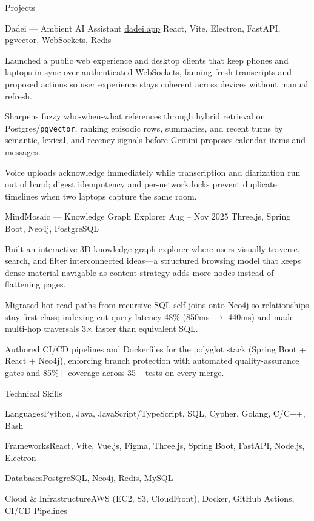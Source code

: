 \documentclass[
	11pt
]{../../../resume}
\begin{document}
	\begin{rSection}{P}{rojects}
		\begin{rSectionEntry}
			{Dadei --- Ambient AI Assistant}
			{\href{https://dadei.app}{dadei.app}}
			{}
			{React, Vite, Electron, FastAPI, pgvector, WebSockets, Redis}
			{}

			\item Launched a public web experience and desktop clients that keep phones and laptops in sync over authenticated WebSockets, fanning fresh transcripts and proposed actions so user experience stays coherent across devices without manual refresh.
			\item Sharpens fuzzy who-when-what references through hybrid retrieval on Postgres/\texttt{pgvector}, ranking episodic rows, summaries, and recent turns by semantic, lexical, and recency signals before Gemini proposes calendar items and messages.
			\item Voice uploads acknowledge immediately while transcription and diarization run out of band; digest idempotency and per-network locks prevent duplicate timelines when two laptops capture the same room.
		\end{rSectionEntry}

		\begin{rSectionEntry}
			{MindMosaic --- Knowledge Graph Explorer}
			{Aug -- Nov 2025}
			{}
			{Three.js, Spring Boot, Neo4j, PostgreSQL}
			{}

			\item Built an interactive 3D knowledge graph explorer where users visually traverse, search, and filter interconnected ideas---a structured browsing model that keeps dense material navigable as content strategy adds more nodes instead of flattening pages.
			\item Migrated hot read paths from recursive SQL self-joins onto Neo4j so relationships stay first-class; indexing cut query latency 48\% (850ms $\rightarrow$ 440ms) and made multi-hop traversals 3$\times$ faster than equivalent SQL.
			\item Authored CI/CD pipelines and Dockerfiles for the polyglot stack (Spring Boot + React + Neo4j), enforcing branch protection with automated quality-assurance gates and 85\%+ coverage across 35+ tests on every merge.
		\end{rSectionEntry}
	\end{rSection}

	\begin{rSection}{T}{echnical Skills}
		\begin{rSet}{Languages}{Python, Java, JavaScript/TypeScript, SQL, Cypher, Golang, C/C++, Bash}
		\end{rSet}
		\begin{rSet}{Frameworks}{React, Vite, Vue.js, Figma, Three.js, Spring Boot, FastAPI, Node.js, Electron}
		\end{rSet}
		\begin{rSet}{Databases}{PostgreSQL, Neo4j, Redis, MySQL}
		\end{rSet}
		\begin{rSet}{Cloud \& Infrastructure}{AWS (EC2, S3, CloudFront), Docker, GitHub Actions, CI/CD Pipelines}
		\end{rSet}
	\end{rSection}
\end{document}
